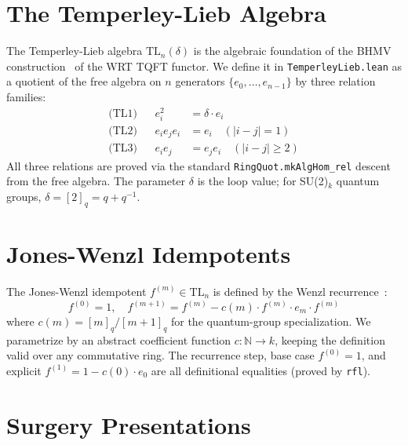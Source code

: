 \documentclass[aps,prl,twocolumn,superscriptaddress]{revtex4-2}
\newcommand{\lean}[1]{\texttt{#1}}
\begin{document}
\section{The Temperley-Lieb Algebra}

The Temperley-Lieb algebra $\mathrm{TL}_n(\delta)$ is the algebraic
foundation of the BHMV construction~\cite{bhmv1995} of the WRT TQFT
functor. We define it in \lean{TemperleyLieb.lean} as a quotient of
the free algebra on $n$ generators $\{e_0, \ldots, e_{n-1}\}$ by
three relation families:
\begin{align}
  \text{(TL1)} && e_i^2 &= \delta \cdot e_i \label{eq:tl1} \\
  \text{(TL2)} && e_i e_j e_i &= e_i \quad (|i-j|=1) \label{eq:tl2} \\
  \text{(TL3)} && e_i e_j &= e_j e_i \quad (|i-j| \ge 2) \label{eq:tl3}
\end{align}
All three relations are proved via the standard
\lean{RingQuot.mkAlgHom\_rel} descent from the free algebra. The
parameter $\delta$ is the loop value; for SU(2)$_k$ quantum groups,
$\delta = [2]_q = q + q^{-1}$.

\section{Jones-Wenzl Idempotents}

The Jones-Wenzl idempotent $f^{(m)} \in \mathrm{TL}_n$ is defined by
the Wenzl recurrence~\cite{wenzl1988}:
\begin{equation}
  f^{(0)} = 1, \quad
  f^{(m+1)} = f^{(m)} - c(m) \cdot f^{(m)} \cdot e_m \cdot f^{(m)}
\end{equation}
where $c(m) = [m]_q / [m+1]_q$ for the quantum-group specialization.
We parametrize by an abstract coefficient function $c : \mathbb{N} \to k$,
keeping the definition valid over any commutative ring. The recurrence
step, base case $f^{(0)} = 1$, and explicit $f^{(1)} = 1 - c(0) \cdot e_0$
are all definitional equalities (proved by \lean{rfl}).

\section{Surgery Presentations}
\end{document}

